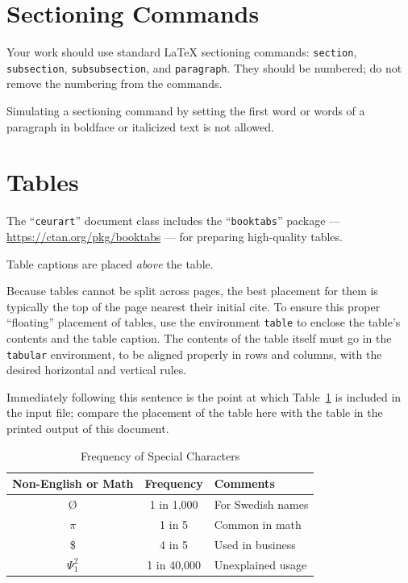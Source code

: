 \documentclass[
twocolumn,
]{ceurart}
\begin{document}
\section{Sectioning Commands}

Your work should use standard \LaTeX{} sectioning commands:
\verb|section|, \verb|subsection|, \verb|subsubsection|, and
\verb|paragraph|. They should be numbered; do not remove the numbering
from the commands.

Simulating a sectioning command by setting the first word or words of
a paragraph in boldface or italicized text is not allowed.

\section{Tables}

The ``\verb|ceurart|'' document class includes the ``\verb|booktabs|''
package --- \url{https://ctan.org/pkg/booktabs} --- for preparing
high-quality tables.

Table captions are placed \textit{above} the table.

Because tables cannot be split across pages, the best placement for
them is typically the top of the page nearest their initial cite.  To
ensure this proper ``floating'' placement of tables, use the
environment \verb|table| to enclose the table's contents and the
table caption. The contents of the table itself must go in the
\verb|tabular| environment, to be aligned properly in rows and
columns, with the desired horizontal and vertical rules.

Immediately following this sentence is the point at which
Table~\ref{tab:freq} is included in the input file; compare the
placement of the table here with the table in the printed output of
this document.

\begin{table}
  \caption{Frequency of Special Characters}
  \label{tab:freq}
  \begin{tabular}{ccl}
    \toprule
    Non-English or Math&Frequency&Comments\\
    \midrule
    \O & 1 in 1,000& For Swedish names\\
    $\pi$ & 1 in 5& Common in math\\
    \$ & 4 in 5 & Used in business\\
    $\Psi^2_1$ & 1 in 40,000& Unexplained usage\\
  \bottomrule
\end{tabular}
\end{table}
\end{document}
